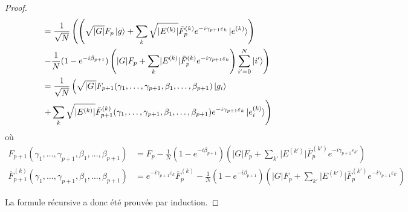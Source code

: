 \begin{proof}
\begin{equation}
\begin{aligned}
&= \frac{1}{\sqrt{ N }} \left( \left( \sqrt{ \lvert G \rvert  } F_{p} \ket{g} + \sum_{k} \sqrt{ \lvert E^{(k)} \rvert  }\bar{F}^{(k)}_{p} e^{-i \gamma_{p+1} \varepsilon_{k}} \ket{e^{(k)}} \right) \right. \\
& \left.- \frac{1}{N} (1 - e^{-i\beta_{p+1}}) \left(  \lvert G \rvert F_{p} + \sum_{k} \lvert E^{(k)} \rvert \bar{F}^{(k)}_{p} e^{-i \gamma_{p+1} \varepsilon_{k}}\right) \sum_{i'=0}^{N} \ket{i'} \right) \\
&= \frac{1}{\sqrt{ N }} \left( \sqrt{ \lvert G \rvert  } F_{p+1}(\gamma_{1}, \dots, \gamma_{p+1}, \beta_{1}, \dots, \beta_{p+1}) \ket{g_{i}} \right. \\
& \left. + \sum_{k} \sqrt{ \lvert E^{(k)} \rvert  } \bar{F}^{(k)}_{p+1}(\gamma_{1}, \dots, \gamma_{p+1}, \beta_{1}, \dots, \beta_{p+1}) e^{-i \gamma_{p+1} \varepsilon_{k}} \ket{e^{(k)}_{i}} \right) \\
\end{aligned}
\end{equation}
où
\begin{equation}
\begin{aligned}
F_{p+1}(\gamma_{1}, \dots, \gamma_{p+1}, \beta_{1}, \dots, \beta_{p+1}) &= F_{p} - \frac{1}{N} (1-e^{-i\beta_{p+1}}) \left( \lvert G \rvert   F_{p} + \sum_{k'} \lvert E^{(k')} \rvert \bar{F}^{(k')}_{p} e^{-i\gamma_{p+1}\varepsilon_{k'}} \right) \\
\bar{F}^{(k)}_{p+1}(\gamma_{1}, \dots, \gamma_{p+1}, \beta_{1}, \dots, \beta_{p+1}) &= e^{-i\gamma_{p+1} \varepsilon_{k}}\bar{F}_{p}^{(k)} - \frac{1}{N} (1-e^{-i\beta_{p+1}}) \left( \lvert G \rvert   F_{p} + \sum_{k'} \lvert E^{(k')} \rvert \bar{F}^{(k')}_{p} e^{-i\gamma_{p+1}\varepsilon_{k'}} \right)
\end{aligned}
\end{equation}

La formule récursive a donc été prouvée par induction.
\end{proof}

